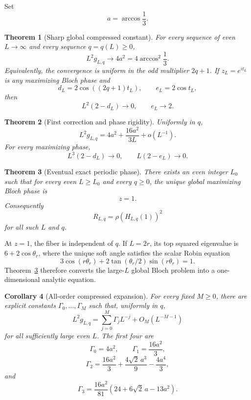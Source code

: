 \documentclass[11pt]{article}
\newtheorem{theorem}{Theorem}[section]
\newtheorem{corollary}[theorem]{Corollary}
\theoremstyle{remark}
\begin{document}
Set
\[
 a=\arccos\frac13.
\]

\begin{theorem}[Sharp global compressed constant]
\label{thm:sharp-compressed}
For every sequence of even $L\to\infty$ and every sequence $q=q(L)\ge0$,
\[
 \boxed{
 L^2g_{L,q}\longrightarrow4a^2
 =4\arccos^2\frac13.
 }
\]
Equivalently, the convergence is uniform in the odd multiplier $2q+1$.
If $z_L=e^{it_L}$ is any maximizing Bloch phase and
\[
 d_L=2\cos((2q+1)t_L),
 \qquad e_L=2\cos t_L,
\]
then
\[
 L^2(2-d_L)\to0,
 \qquad e_L\to2.
\]
\end{theorem}

\begin{theorem}[First correction and phase rigidity]
\label{thm:first-correction}
Uniformly in $q$,
\[
 \boxed{
 L^2g_{L,q}
 =4a^2+\frac{16a^2}{3L}+o(L^{-1}).
 }
\]
For every maximizing phase,
\[
 L^3(2-d_L)\to0,
 \qquad
 L(2-e_L)\to0.
\]
\end{theorem}

\begin{theorem}[Eventual exact periodic phase]
\label{thm:eventual-z1}
There exists an even integer $L_0$ such that for every even $L\ge L_0$ and
every $q\ge0$, the unique global maximizing Bloch phase is
\[
 \boxed{z=1.}
\]
Consequently
\[
 R_{L,q}=\rho(H_{L,q}(1))^2
\]
for all such $L$ and $q$.
\end{theorem}

At $z=1$, the fiber is independent of $q$.  If $L=2r$, its top squared
eigenvalue is $6+2\cos\theta_r$, where the unique soft angle satisfies the
scalar Robin equation
\begin{equation}
 3\cos(r\theta_r)
 +2\tan(\theta_r/2)\sin(r\theta_r)=1.
 \label{eq:robin}
\end{equation}
Theorem~\ref{thm:eventual-z1} therefore converts the large-$L$ global Bloch
problem into a one-dimensional analytic equation.

\begin{corollary}[All-order compressed expansion]
\label{cor:all-order}
For every fixed $M\ge0$, there are explicit constants
$\Gamma_0,\ldots,\Gamma_M$ such that, uniformly in $q$,
\[
 L^2g_{L,q}
 =\sum_{j=0}^{M}\Gamma_jL^{-j}+O_M(L^{-M-1})
\]
for all sufficiently large even $L$.  The first four are
\[
 \Gamma_0=4a^2,
 \qquad
 \Gamma_1=\frac{16a^2}{3},
\]
\[
 \Gamma_2
 =\frac{16a^2}{3}
 +\frac{4\sqrt2\,a^3}{9}
 -\frac{4a^4}{3},
\]
and
\[
 \Gamma_3
 =\frac{16a^2}{81}
 \left(24+6\sqrt2\,a-13a^2\right).
\]
\end{corollary}
\end{document}
